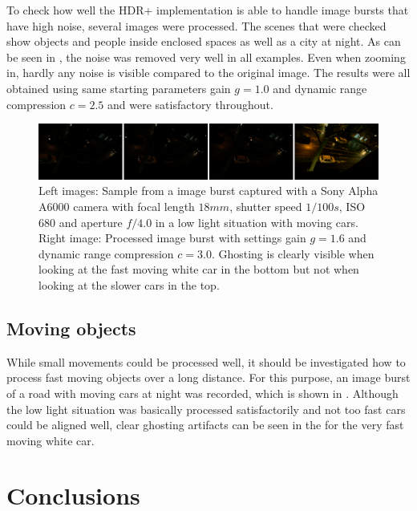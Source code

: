 \documentclass{egpubl}
\begin{document}
To check how well the HDR+ implementation is able to handle image bursts that have high noise, several 
images were processed. The scenes that were checked show objects and people inside enclosed 
spaces as well as a city at night. As can be seen in , the noise was 
removed very well in all examples. Even when zooming in, hardly any noise is visible 
compared to the original image. The results were all obtained using same starting 
parameters gain $g=1.0$ and dynamic range compression $c=2.5$ and were satisfactory throughout.

\begin{figure}
      \hspace{\fill}
      \includegraphics[width=0.9\linewidth]{images/moving_burst.png}
      \hspace{\fill}
      \centering
      \caption{
            Left images: Sample from a image burst captured with a Sony Alpha A6000 camera
            with focal length $18mm$, shutter speed $1/100s$, ISO $680$ 
            and aperture $f/4.0$ in a low light situation with moving cars.
            Right image: Processed image burst with settings gain $g = 1.6$ and dynamic 
            range compression $c = 3.0$. Ghosting is clearly visible when looking at the 
            fast moving white car in the bottom but not when looking at the slower cars
            in the top.
      }
      \label{fig:moving}
\end{figure}

\subsection{Moving objects}
\label{sec:moving}

While small movements could be processed well, it should be investigated how to 
process fast moving objects over a long distance. For this purpose, an image burst 
of a road with moving cars at night was recorded, which is shown in . 
Although the low light situation was basically processed satisfactorily and not 
too fast cars could be aligned well, clear ghosting artifacts can be seen in the 
for the very fast moving white car.

\section{Conclusions}
\label{sec:conclusion}
\end{document}
